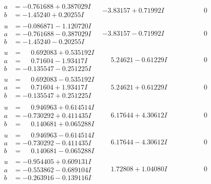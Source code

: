 \documentclass[1p]{elsarticle_modified}
\theoremstyle{definition}
\begin{document}
$$\begin{array}{c|c|c}
\begin{aligned}
a &= -0.761688 + 0.387029 I \\
b &= -1.45240 + 0.20255 I\end{aligned}
 & -3.83157 + 0.71992 I & \phantom{-0.000000 } 0 \\ \hline\begin{aligned}
u &= -0.086871 - 1.120720 I \\
a &= -0.761688 - 0.387029 I \\
b &= -1.45240 - 0.20255 I\end{aligned}
 & -3.83157 - 0.71992 I & \phantom{-0.000000 } 0 \\ \hline\begin{aligned}
u &= \phantom{-}0.692083 + 0.535192 I \\
a &= \phantom{-}0.71604 - 1.93417 I \\
b &= -0.135547 - 0.251225 I\end{aligned}
 & \phantom{-}5.24621 - 0.61229 I & \phantom{-0.000000 } 0 \\ \hline\begin{aligned}
u &= \phantom{-}0.692083 - 0.535192 I \\
a &= \phantom{-}0.71604 + 1.93417 I \\
b &= -0.135547 + 0.251225 I\end{aligned}
 & \phantom{-}5.24621 + 0.61229 I & \phantom{-0.000000 } 0 \\ \hline\begin{aligned}
u &= \phantom{-}0.946963 + 0.614514 I \\
a &= -0.730292 + 0.411435 I \\
b &= \phantom{-}0.140681 + 0.065288 I\end{aligned}
 & \phantom{-}6.17644 + 4.30612 I & \phantom{-0.000000 } 0 \\ \hline\begin{aligned}
u &= \phantom{-}0.946963 - 0.614514 I \\
a &= -0.730292 - 0.411435 I \\
b &= \phantom{-}0.140681 - 0.065288 I\end{aligned}
 & \phantom{-}6.17644 - 4.30612 I & \phantom{-0.000000 } 0 \\ \hline\begin{aligned}
u &= -0.954405 + 0.609131 I \\
a &= -0.553862 - 0.689104 I \\
b &= -0.263916 - 0.139116 I\end{aligned}
 & \phantom{-}1.72808 + 1.04080 I & \phantom{-0.000000 } 0 \\ \hline\begin{aligned}

\end{aligned}
\end{array}$$
\end{document}
